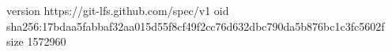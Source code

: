 version https://git-lfs.github.com/spec/v1
oid sha256:17bdaa5fabbaf32aa015d55f8cf49f2cc76d632dbc790da5b876bc1c3fc5602f
size 1572960
